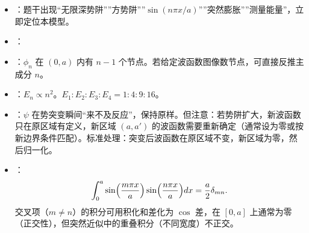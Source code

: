 \begin{tipbox}[快速识别与解题技巧]
\begin{itemize}
    \item {}：题干出现``无限深势阱''''方势阱''''$\sin(n\pi x/a)$''''突然膨胀''''测量能量''，立即定位本模型。
    \item {}：
    \begin{center}
    \end{center}
    \item {}：$\phi_n$ 在 $(0,a)$ 内有 $n-1$ 个节点。若给定波函数图像数节点，可直接反推主成分 $n$。
    \item {}：$E_n\propto n^2$。$E_1:E_2:E_3:E_4=1:4:9:16$。
    \item {}：$\psi$ 在势突变瞬间``来不及反应''，保持原样。但注意：若势阱扩大，新波函数只在原区域有定义，新区域 $(a,a')$ 的波函数需要重新确定（通常设为零或按新边界条件匹配）。标准处理：突变后波函数在原区域不变，新区域为零，然后归一化。
    \item {}：
    \[
    \int_0^a\sin\Bigl(\frac{m\pi x}{a}\Bigr)\sin\Bigl(\frac{n\pi x}{a}\Bigr)dx=\frac{a}{2}\delta_{mn}.
    \]
    交叉项（$m\neq n$）的积分可用积化和差化为 $\cos$ 差，在 $[0,a]$ 上通常为零（正交性），但突然近似中的重叠积分（不同宽度）不正交。
\end{itemize}
\end{tipbox}

